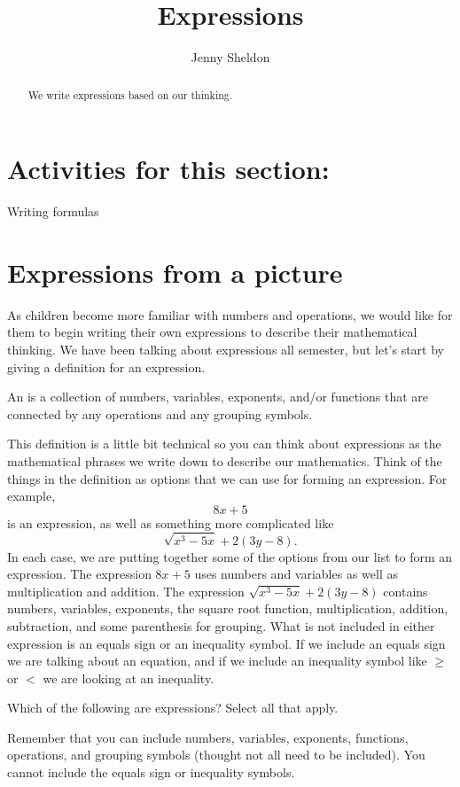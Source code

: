 \documentclass{ximera}
\title{Expressions}
\author{Jenny Sheldon}
\begin{document}
\begin{abstract}
We write expressions based on our thinking.
\end{abstract}
\maketitle

\section{Activities for this section:} Writing formulas

\section{Expressions from a picture}

As children become more familiar with numbers and operations, we would like for them to begin writing their own expressions to describe their mathematical thinking. We have been talking about expressions all semester, but let's start by giving a definition for an expression.

\begin{definition}
An  is a collection of numbers, variables, exponents, and/or functions that are connected by any operations and any grouping symbols.
\end{definition}
This definition is a little bit technical so you can think about expressions as the mathematical phrases we write down to describe our mathematics. Think of the things in the definition as options that we can use for forming an expression. For example, 
\[
8x + 5
\]
is an expression, as well as something more complicated like
\[
\sqrt{x^3 - 5x} + 2(3y - 8).
\]
In each case, we are putting together some of the options from our list to form an expression. The expression $8x+5$ uses numbers and variables as well as multiplication and addition. The expression $\sqrt{x^3 - 5x} + 2(3y - 8)$ contains numbers, variables, exponents, the square root function, multiplication, addition, subtraction, and some parenthesis for grouping. What is not included in either expression is an equals sign or an inequality symbol. If we include an equals sign we are talking about an equation, and if we include an inequality symbol like $\geq$ or $<$ we are looking at an inequality.

\begin{question}
Which of the following are expressions? Select all that apply.
\begin{selectAll}
\end{selectAll}
\begin{hint}
Remember that you can include numbers, variables, exponents, functions, operations, and grouping symbols (thought not all need to be included). You cannot include the equals sign or inequality symbols.
\end{hint}
\end{question}
\end{document}
